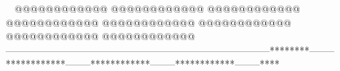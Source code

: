     @@@@@@@@@@@@        @@@@@@@@@@@@        @@@@@@@@@@@@        @@@@@@@@@@@@        @@@@@@@@@@@@        @@@@@@@@@@@@        @@@@@@@@@@@@        @@@@@@@@@@@@    --------------------------------------------------------------------------------********--------************--------************--------************--------****